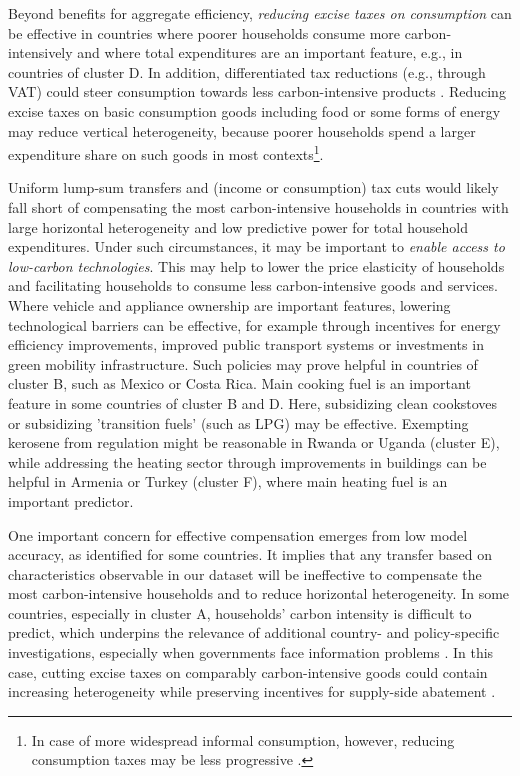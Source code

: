\documentclass[12pt, a4paper]{article}
\begin{document}
Beyond benefits for aggregate efficiency, \textit{reducing excise taxes on consumption} can be effective in countries where poorer households consume more carbon-intensively and where total expenditures are an important feature, e.g., in countries of cluster D. In addition, differentiated tax reductions (e.g., through VAT) could steer consumption towards less carbon-intensive products \autocite{Klenert.2023}. Reducing excise taxes on basic consumption goods including food or some forms of energy may reduce vertical heterogeneity, because poorer households spend a larger expenditure share on such goods in most contexts\footnote{In case of more widespread informal consumption, however, reducing consumption taxes may be less progressive \autocite{Bachas.2020}.}. 

Uniform lump-sum transfers and (income or consumption) tax cuts would likely fall short of compensating the most carbon-intensive households in countries with large horizontal heterogeneity and low predictive power for total household expenditures. Under such circumstances, it may be important to \textit{enable access to low-carbon technologies}. This may help to lower the price elasticity of households and facilitating households to consume less carbon-intensive goods and services. Where vehicle and appliance ownership are important features, lowering technological barriers can be effective, for example through incentives for energy efficiency improvements, improved public transport systems or investments in green mobility infrastructure. Such policies may prove helpful in countries of cluster B, such as Mexico or Costa Rica. %
Main cooking fuel is an important feature in some countries of cluster B and D. Here, subsidizing clean cookstoves or subsidizing 'transition fuels' (such as LPG) may be effective. Exempting kerosene from regulation might be reasonable in Rwanda or Uganda (cluster E), while addressing the heating sector through improvements in buildings can be helpful in Armenia or Turkey (cluster F), where main heating fuel is an important predictor. %

One important concern for effective compensation emerges from low model accuracy, as identified for some countries. It implies that any transfer based on characteristics observable in our dataset will be ineffective to compensate the most carbon-intensive households and to reduce horizontal heterogeneity. In some countries, especially in cluster A, households' carbon intensity is difficult to predict, which underpins the relevance of additional country- and policy-specific investigations, especially when governments face information problems \autocite{Mirrlees.1971}. In this case, cutting excise taxes on comparably carbon-intensive goods could contain increasing heterogeneity while preserving incentives for supply-side abatement \autocite{Goulder.2008}.
\end{document}
